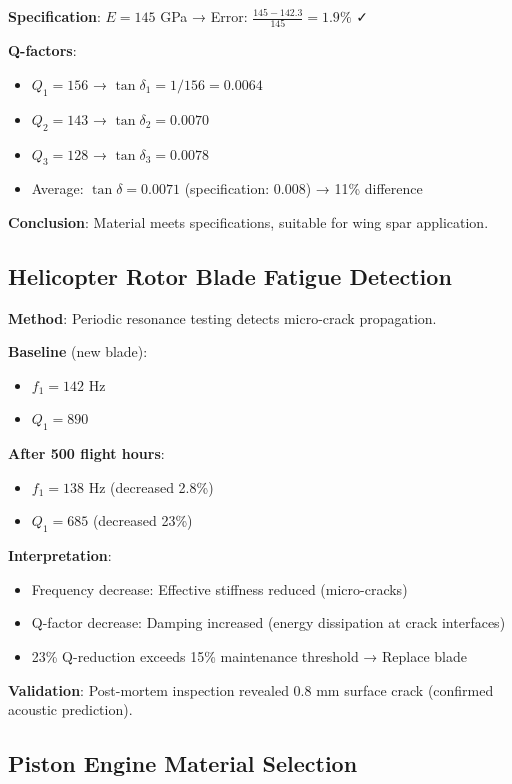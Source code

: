 \documentclass[12pt,a4paper]{article}
\begin{document}
\textbf{Specification}: $E = 145$ GPa → Error: $\frac{145-142.3}{145} = 1.9\%$ ✓

\textbf{Q-factors}:
\begin{itemize}
\item $Q_1 = 156$ → $\tan\delta_1 = 1/156 = 0.0064$
\item $Q_2 = 143$ → $\tan\delta_2 = 0.0070$
\item $Q_3 = 128$ → $\tan\delta_3 = 0.0078$
\item Average: $\tan\delta = 0.0071$ (specification: 0.008) → 11\% difference
\end{itemize}

\textbf{Conclusion}: Material meets specifications, suitable for wing spar application.

\subsection{Helicopter Rotor Blade Fatigue Detection}

\textbf{Method}: Periodic resonance testing detects micro-crack propagation.

\textbf{Baseline} (new blade):
\begin{itemize}
\item $f_1 = 142$ Hz
\item $Q_1 = 890$
\end{itemize}

\textbf{After 500 flight hours}:
\begin{itemize}
\item $f_1 = 138$ Hz (decreased 2.8\%)
\item $Q_1 = 685$ (decreased 23\%)
\end{itemize}

\textbf{Interpretation}:
\begin{itemize}
\item Frequency decrease: Effective stiffness reduced (micro-cracks)
\item Q-factor decrease: Damping increased (energy dissipation at crack interfaces)
\item 23\% Q-reduction exceeds 15\% maintenance threshold → Replace blade
\end{itemize}

\textbf{Validation}: Post-mortem inspection revealed 0.8 mm surface crack (confirmed acoustic prediction).

\subsection{Piston Engine Material Selection}
\end{document}
